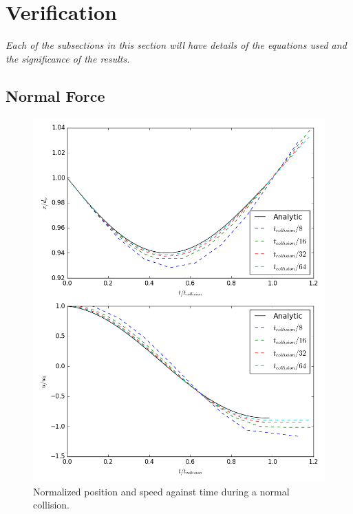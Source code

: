 \documentclass[10pt,a4paper,titlepage]{report}
\begin{document}
\section{Verification}
\textit{Each of the subsections in this section will have details of the equations used and the significance of the results.}
\subsection{Normal Force}
\begin{figure}[!htb]
\centering
\includegraphics[scale=0.5]{figures/normal_force_verification.png}
\caption{Normalized position and speed against time during a normal collision.}
\label{fig:normal_force_verification}
\end{figure}
\end{document}

